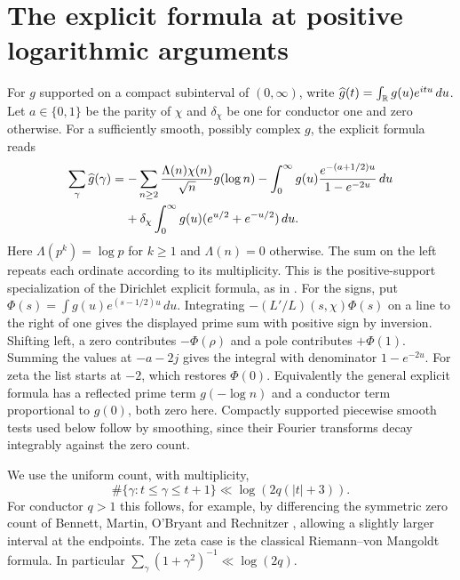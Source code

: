 \documentclass[11pt]{article}
\newcommand{\dd}{\,d}\DeclareMathOperator{\sinc}{sinc}
\begin{document}
\section{The explicit formula at positive logarithmic arguments}
For $g$ supported on a compact subinterval of $(0,\infty)$, write
$\wh g(t)=\int_\R g(u)e^{itu}\dd u$. Let $a\in\{0,1\}$ be the parity of
$\chi$ and $\delta_\chi$ be one for conductor one and zero otherwise.
For a sufficiently smooth, possibly complex $g$, the explicit formula reads
\begin{align}
 \sum_\gamma \wh g(\gamma)
 &=-\sum_{n\ge2}\frac{\Lambda(n)\chi(n)}{\sqrt n}g(\log n)
   -\int_0^\infty g(u)\frac{e^{-(a+1/2)u}}{1-e^{-2u}}\dd u \nonumber\\
 &\hspace{1.1em}+\delta_\chi\int_0^\infty
           g(u)(e^{u/2}+e^{-u/2})\dd u .\label{eq:weil}
\end{align}
Here $\Lambda(p^k)=\log p$ for $k\ge1$ and $\Lambda(n)=0$ otherwise. The sum on the left repeats each ordinate according to its multiplicity.
This is the positive-support specialization of the Dirichlet explicit
formula, as in \cite[Lemma 2.1]{liuye}. For the signs, put
$\Phi(s)=\int g(u)e^{(s-1/2)u}\dd u$. Integrating
$-(L'/L)(s,\chi)\Phi(s)$ on a line to the right of one gives the displayed
prime sum with positive sign by inversion. Shifting left, a zero
contributes $-\Phi(\rho)$ and a pole contributes $+\Phi(1)$.
Summing the values at $-a-2j$ gives the integral with denominator
$1-e^{-2u}$. For zeta the list starts at $-2$, which restores $\Phi(0)$.
Equivalently the general explicit formula has a reflected prime term
$g(-\log n)$ and a conductor term proportional to $g(0)$, both zero here.
Compactly supported piecewise smooth tests used below follow by smoothing,
since their Fourier transforms decay integrably against the zero count.

We use the uniform count, with multiplicity,
\begin{equation}\label{eq:count}
 \#\{\gamma:t\le\gamma\le t+1\}\ll\log(2q(|t|+3)).
\end{equation}
For conductor $q>1$ this follows, for example, by differencing the
symmetric zero count of Bennett, Martin, O'Bryant and Rechnitzer
\cite{count}, allowing a slightly larger interval at the endpoints.
The zeta case is the classical Riemann--von Mangoldt formula.
In particular $\sum_\gamma (1+\gamma^2)^{-1}\ll \log(2q)$.
\end{document}
